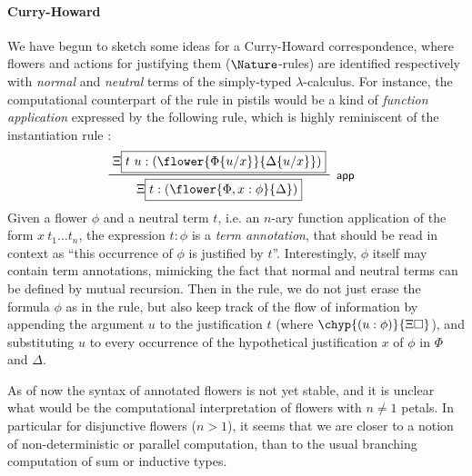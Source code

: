 \paragraph{Curry-Howard}

We have begun to sketch some ideas for a Curry-Howard correspondence, where
flowers and \Proof actions for justifying them ($\Nature$-rules) are identified
respectively with \emph{normal} and \emph{neutral} terms of the simply-typed
$\lambda$-calculus. For instance, the computational counterpart of the rule
 in pistils would be a kind of \emph{function application}
expressed by the following  rule, which is highly reminiscent of the
instantiation rule :
$$
\R[\rsf{app}]
  {\Xi\select{t~u : (\flower{\subst{\Phi}{u}{x}}{\subst{\Delta}{u}{x}})}}
  {\Xi\select{t : (\flower{\Phi, x : \phi}{\Delta})}}
$$
Given a flower $\phi$ and a neutral term $t$, i.e. an $n$-ary function
application of the form $x~t_1 \ldots t_n$, the expression $t : \phi$ is a
\emph{term annotation}, that should be read in context as ``this occurrence of
$\phi$ is justified by $t$''. Interestingly, $\phi$ itself may contain term
annotations, mimicking the fact that normal and neutral terms can be defined by
mutual recursion. Then in the  rule, we do not just erase the formula
$\phi$ as in the  rule, but also keep track of the flow of
information by appending the argument $u$ to the justification $t$ (where
$\chyp{(u : \phi)}{\Xi\hole}$), and substituting $u$ to every occurrence of the
hypothetical justification $x$ of $\phi$ in $\Phi$ and $\Delta$.

As of now the syntax of annotated flowers is not yet stable, and it is unclear
what would be the computational interpretation of flowers with $n \not= 1$
petals. In particular for disjunctive flowers ($n > 1$), it seems that we are
closer to a notion of non-deterministic or parallel computation, than to the
usual branching computation of sum or inductive types.

